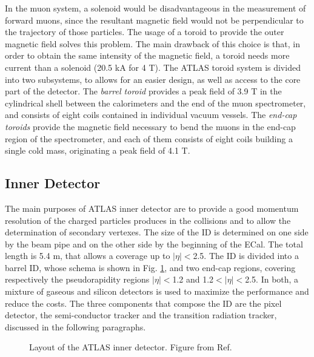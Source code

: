 In the muon system, a solenoid would be disadvantageous in the measurement of forward muons, since the resultant magnetic field would not be perpendicular to the trajectory of those particles. The usage of a toroid to provide the outer magnetic field solves this problem. The main drawback of this choice is that, in order to obtain the same intensity of the magnetic field, a toroid needs more current than a solenoid (20.5 kA for 4 T).
The ATLAS toroid system is divided into two subsystems, to allows for an easier design, as well as access to the core part of the detector.
The \textit{barrel toroid} \cite{ATLAS:1997ac} provides a peak field of 3.9 T in the cylindrical shell between the calorimeters and the end of the muon spectrometer, and consists of eight coils contained in individual vacuum vessels.  
The \textit{end-cap toroids} \cite{ATLAS:1997ab} provide the magnetic field necessary to bend the muons in the end-cap region of the spectrometer, and each of them consists of eight coils building a single cold mass, originating a peak field of 4.1 T. 



\subsection{Inner Detector}
\label{sec:atlas:id}

The main purposes of ATLAS inner detector \cite{ATLAS:1997ag,ATLAS:1997af} are to provide a good momentum resolution of the charged particles produces in the collisions and to allow the determination of secondary vertexes. The size of the ID is determined on one side by the beam pipe and on the other side by the beginning of the ECal. The total length is 5.4 m, that allows a coverage up to $|\eta|<$2.5.
The ID is divided into a barrel ID, whose schema is shown in Fig. \ref{fig:atlas:id}, and two end-cap regions, covering respectively the pseudorapidity regions $|\eta|<$1.2 and 1.2$<|\eta|<$2.5. In both, a mixture of gaseous and silicon detectors is used to maximize the performance and reduce the costs. The three components that compose the ID are the pixel detector, the semi-conductor tracker and the transition radiation tracker, discussed in the following paragraphs.

\begin{figure}[ht]
\centering
{}
\caption{Layout of the ATLAS inner detector. Figure from Ref. \cite{Potamianos:2016ptf}}
\label{fig:atlas:id}
\end{figure}


